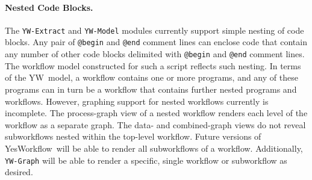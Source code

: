 \documentclass{article}
\newcommand{\YW}{\textsf{YesWorkflow}}
\newcommand{\yw}{\textsf{YW}}
\newcommand{\ywa}[1]{\texttt{#1}}
\newcommand{\ywm}[1]{\texttt{#1}}
\begin{document}


\paragraph{Nested Code Blocks.}
The \ywm{YW-Extract} and \ywm{YW-Model} modules currently support
simple nesting of code blocks. Any pair of \ywa{@begin} and \ywa{@end}
comment lines can enclose code that contain any number of other code
blocks delimited with \ywa{@begin} and \ywa{@end} comment lines. The
workflow model constructed for such a script reflects such nesting. In
terms of the \yw\ model, a workflow contains one or more programs, and
any of these programs can in turn be a workflow that contains further
nested programs and workflows.
%
However, graphing support for nested workflows currently is
incomplete. The process-graph view of a nested workflow renders each
level of the workflow as a separate graph. The data- and
combined-graph views do not reveal subworkflows nested within the
top-level workflow. Future versions of \YW\ will be able to render all
subworkflows of a workflow. Additionally, \ywm{YW-Graph} will be able
to render a specific, single workflow or subworkflow as desired.
\end{document}
